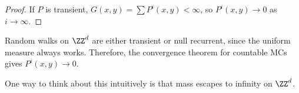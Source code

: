\begin{proof}
If $P$ is transient, $G(x,y) = \sum P^i(x,y) < \infty$, so $P^i(x,y)\rightarrow 0$ as $i\rightarrow \infty$. 
\end{proof}

\begin{example}
\exlabel

Random walks on $\ZZ^d$ are either transient or null recurrent, since the uniform measure always works. Therefore, the convergence theorem for countable MCs gives $P^i(x,y)\rightarrow 0$. 
\end{example}

One way to think about this intuitively is that mass escapes to infinity on $\ZZ^d$. 
